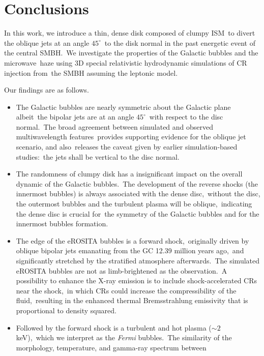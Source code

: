 \documentclass[fleqn,usenatbib,useAMS]{mnras}
\begin{document}
\section{Conclusions}
\label{Conclusions}
In this work, we introduce a thin, dense disk composed of clumpy ISM\
to divert the oblique jets at an angle $45^{\circ}$\
to the disk normal in the past energetic event of the central SMBH.\
We investigate the properties of the Galactic bubbles and the microwave\
haze using 3D special relativistic hydrodynamic simulations of CR injection from\
the SMBH assuming the leptonic model.


Our findings are as follows.

\begin{itemize}

\item The Galactic bubbles are nearly symmetric about the Galactic plane albeit\
      the bipolar jets are at an angle $45^{\circ}$\
      with respect to the disc normal.\
      The broad agreement between simulated and observed multiwavelength features\
      provides supporting evidence for the oblique jet scenario, and also\
      releases the caveat given by earlier simulation-based studies:\
      the jets shall be vertical to the disc normal.
\item The randomness of clumpy disk has a insignificant impact on the overall dynamic of the Galactic bubbles.\
      The development of the reverse shocks (the innermost bubbles) is always associated with the dense disc,\
      without the disc, the outermost bubbles and the turbulent plasma will be oblique,\
      indicating the dense disc is crucial for\
      the symmetry of the Galactic bubbles and for the innermost bubbles formation.
\item The edge of the eROSITA bubbles is a forward shock,\
      originally driven by oblique bipolar jets emanating from the GC 12.39 million years ago,\
      and significantly stretched by the stratified atmosphere afterwards.\
      The simulated eROSITA bubbles are not as limb-brightened as the observation.\
      A possibility to enhance the X-ray emission is to include shock-accelerated CRs near the shock,\
      in which CRs could increase the compressibility of the fluid,\
      resulting in the enhanced thermal Bremsstrahlung emissivity that is proportional to density squared.
\item Followed by the forward shock is a turbulent and hot plasma ($\sim2$ keV),\
      which we interpret as the \textit{Fermi} bubbles.\
      The similarity of the morphology, temperature, and gamma-ray spectrum between\

\end{itemize}
\end{document}
